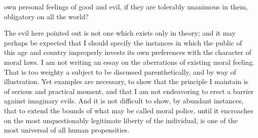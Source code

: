 \documentclass[12pt]{report}
\begin{document}
own personal feelings of good and evil, if they are tolerably unanimous in them, obligatory on all the world?

The evil here pointed out is not one which exists only in theory; and it may perhaps be expected that I should specify the instances in which the public of this age and country improperly invests its own preferences with the character of moral laws. I am not writing an essay on the aberrations of existing moral feeling. That is too weighty a subject to be discussed parenthetically, and by way of illustration. Yet examples are necessary, to show that the principle I maintain is of serious and practical moment, and that I am not endeavoring to erect a barrier against imaginary evils. And it is not difficult to show, by abundant instances, that to extend the bounds of what may be called moral police, until it encroaches on the most unquestionably legitimate liberty of the individual, is one of the most universal of all human propensities.
\end{document}
